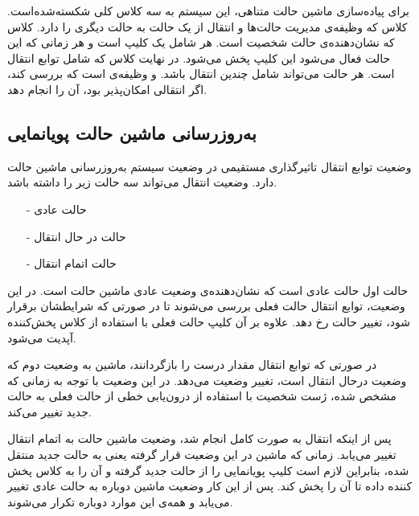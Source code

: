 برای پیا‌ده‌سازی ماشین حالت متناهی، این سیستم به سه کلاس کلی شکسته‌شده‌است. کلاس
که وظیفه‌ی مدیریت حالت‌ها و انتقال از یک حالت به حالت دیگری را دارد.
کلاس 
که نشان‌دهنده‌ی حالت شخصیت است. هر 
شامل یک کلیپ است و هر زمانی که این حالت فعال می‌شود این کلیپ پخش می‌شود.
 در نهایت کلاس
که شامل توابع انتقال است.
هر حالت می‌تواند شامل چندین انتقال باشد. و وظیفه‌ی
است که بررسی کند، اگر انتقالی امکان‌پذیر بود، آن را انجام دهد.

\subsection{به‌روزرسانی ماشین حالت پویانمایی}

وضعیت توابع انتقال تاثیرگذاری مستقیمی در وضعیت سیستم به‌روزرسانی ماشین حالت دارد.
وضعیت انتقال می‌تواند سه حالت زیر را داشته باشد.

\begin{enumerate}
	\item[-] حالت عادی 
	\item[-] حالت در حال انتقال 
	\item[-] حالت اتمام انتقال 
\end{enumerate}


حالت اول حالت عادی
است که نشان‌دهنده‌ی وضعیت عادی ماشین حالت است. در این وضعیت، توابع انتقال حالت فعلی بررسی می‌شوند تا در صورتی که شرایطشان برقرار شود، تغییر حالت رخ دهد. علاوه بر آن کلیپ حالت فعلی با استفاده از کلاس پخش‌کننده آپدیت می‌شود.

در صورتی که توابع انتقال مقدار درست
را بازگردانند، ماشین به وضعیت دوم که وضعیت درحال انتقال
است، تغییر وضعیت می‌دهد.
در این وضعیت با توجه به زمانی که مشخص شده، ژست شخصیت با استفاده از درون‌یابی خطی از حالت فعلی به حالت جدید تغییر می‌کند.

پس از اینکه انتقال به صورت کامل انجام شد، وضعیت ماشین حالت به اتمام انتقال
تغییر می‌یابد. زمانی که ماشین‌ در این وضعیت قرار گرفته یعنی به حالت جدید منتقل شده، بنابراین لازم است کلیپ پویانمایی را از حالت جدید گرفته و آن را به کلاس پخش کننده داده تا آن را پخش کند.
پس از این کار وضعیت ماشین دوباره به حالت عادی تغییر می‌یابد و همه‌ی این موارد دوباره تکرار می‌شوند.

